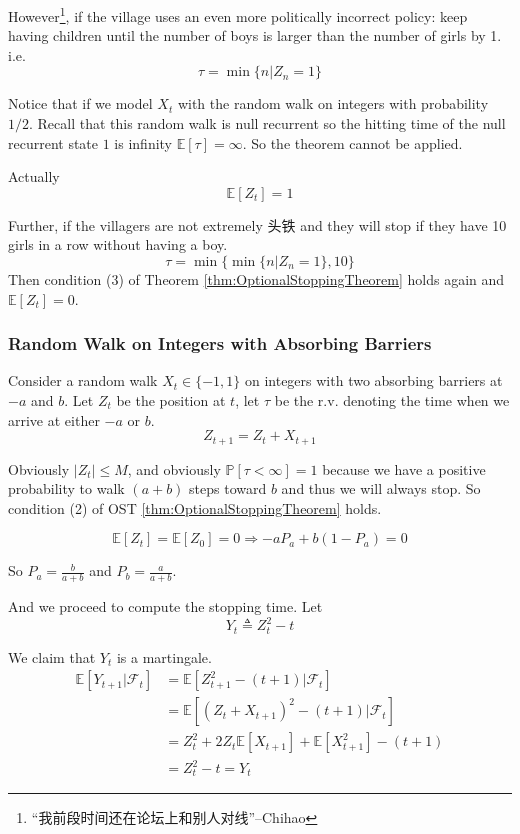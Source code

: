             However\footnote{“我前段时间还在论坛上和别人对线”--Chihao}, if the village uses an even more politically incorrect policy: keep having children until the number of boys is larger than the number of girls by 1. i.e.
            \[ \tau = \min\{n|Z_n=1\} \]
            
            Notice that if we model $X_t$ with the random walk on integers with probability $1/2$. Recall that this random walk is null recurrent so the hitting time of the null recurrent state $1$ is infinity $\mathbb{E}[\tau] = \infty$. So the theorem cannot be applied.
            
            Actually
            \[ \mathbb{E}[Z_t] = 1 \]

            Further, if the villagers are not extremely 头铁 and they will stop if they have 10 girls in a row without having a boy.
            \[ \tau = \min\{\min\{n|Z_n=1\}, 10\} \]
            Then condition (3) of Theorem \ref{thm:OptionalStoppingTheorem} holds again and $\mathbb{E}[Z_t] = 0$.

        \subsubsection{Random Walk on Integers with Absorbing Barriers}
            Consider a random walk $X_t \in \{-1, 1\}$ on integers with two absorbing barriers at $-a$ and $b$. Let $Z_t$ be the position at $t$, let $\tau$ be the r.v. denoting the time when we arrive at either $-a$ or $b$.
            \[ Z_{t+1} = Z_t + X_{t+1} \]

            Obviously $|Z_t| \le M$, and obviously $\mathbb{P}[\tau < \infty]=1$ because we have a positive probability to walk $(a+b)$ steps toward $b$ and thus we will always stop. So condition (2) of OST \ref{thm:OptionalStoppingTheorem} holds.

            \[ \mathbb{E}[Z_t] = \mathbb{E}[Z_0] = 0 \Rightarrow -aP_a + b(1-P_a) = 0 \]

            So $P_a = \frac{b}{a+b}$ and $P_b = \frac{a}{a+b}$.

            And we proceed to compute the stopping time. Let
            \[ Y_t \triangleq Z_t^2 - t \]

            We claim that $Y_t$ is a martingale.
            \begin{align*}
                \mathbb{E}[Y_{t+1}|\mathcal{F}_t] &= \mathbb{E}[Z_{t+1}^2 - (t+1)|\mathcal{F}_t]\\
                &= \mathbb{E}[(Z_t + X_{t+1})^2 - (t+1) | \mathcal{F}_t]\\
                &= Z_t^2 + 2Z_t\mathbb{E}[X_{t+1}] + \mathbb{E}[X_{t+1}^2] - (t+1)\\
                &= Z_t^2 - t = Y_t
            \end{align*}

